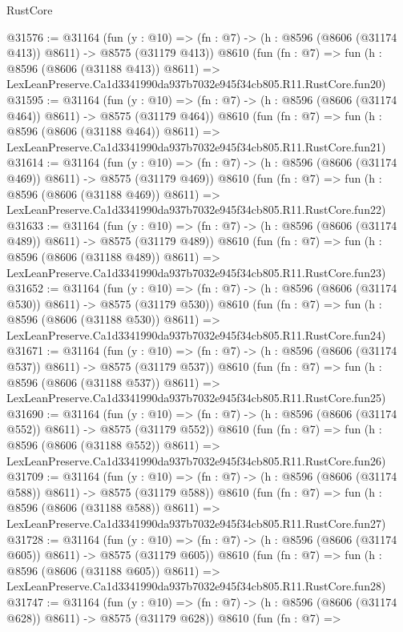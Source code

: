 \begin{lexlean}{RustCore}
\begin{coremodule}
@31576 := @31164
    (fun (y : @10) => (fn : @7) -> (h : @8596 (@8606 (@31174 @413)) @8611) -> @8575 (@31179 @413))
    @8610
    (fun (fn : @7) =>
    fun (h : @8596 (@8606 (@31188 @413)) @8611) =>
    LexLeanPreserve.Ca1d3341990da937b7032e945f34cb805.R11.RustCore.fun20)
@31595 := @31164
    (fun (y : @10) => (fn : @7) -> (h : @8596 (@8606 (@31174 @464)) @8611) -> @8575 (@31179 @464))
    @8610
    (fun (fn : @7) =>
    fun (h : @8596 (@8606 (@31188 @464)) @8611) =>
    LexLeanPreserve.Ca1d3341990da937b7032e945f34cb805.R11.RustCore.fun21)
@31614 := @31164
    (fun (y : @10) => (fn : @7) -> (h : @8596 (@8606 (@31174 @469)) @8611) -> @8575 (@31179 @469))
    @8610
    (fun (fn : @7) =>
    fun (h : @8596 (@8606 (@31188 @469)) @8611) =>
    LexLeanPreserve.Ca1d3341990da937b7032e945f34cb805.R11.RustCore.fun22)
@31633 := @31164
    (fun (y : @10) => (fn : @7) -> (h : @8596 (@8606 (@31174 @489)) @8611) -> @8575 (@31179 @489))
    @8610
    (fun (fn : @7) =>
    fun (h : @8596 (@8606 (@31188 @489)) @8611) =>
    LexLeanPreserve.Ca1d3341990da937b7032e945f34cb805.R11.RustCore.fun23)
@31652 := @31164
    (fun (y : @10) => (fn : @7) -> (h : @8596 (@8606 (@31174 @530)) @8611) -> @8575 (@31179 @530))
    @8610
    (fun (fn : @7) =>
    fun (h : @8596 (@8606 (@31188 @530)) @8611) =>
    LexLeanPreserve.Ca1d3341990da937b7032e945f34cb805.R11.RustCore.fun24)
@31671 := @31164
    (fun (y : @10) => (fn : @7) -> (h : @8596 (@8606 (@31174 @537)) @8611) -> @8575 (@31179 @537))
    @8610
    (fun (fn : @7) =>
    fun (h : @8596 (@8606 (@31188 @537)) @8611) =>
    LexLeanPreserve.Ca1d3341990da937b7032e945f34cb805.R11.RustCore.fun25)
@31690 := @31164
    (fun (y : @10) => (fn : @7) -> (h : @8596 (@8606 (@31174 @552)) @8611) -> @8575 (@31179 @552))
    @8610
    (fun (fn : @7) =>
    fun (h : @8596 (@8606 (@31188 @552)) @8611) =>
    LexLeanPreserve.Ca1d3341990da937b7032e945f34cb805.R11.RustCore.fun26)
@31709 := @31164
    (fun (y : @10) => (fn : @7) -> (h : @8596 (@8606 (@31174 @588)) @8611) -> @8575 (@31179 @588))
    @8610
    (fun (fn : @7) =>
    fun (h : @8596 (@8606 (@31188 @588)) @8611) =>
    LexLeanPreserve.Ca1d3341990da937b7032e945f34cb805.R11.RustCore.fun27)
@31728 := @31164
    (fun (y : @10) => (fn : @7) -> (h : @8596 (@8606 (@31174 @605)) @8611) -> @8575 (@31179 @605))
    @8610
    (fun (fn : @7) =>
    fun (h : @8596 (@8606 (@31188 @605)) @8611) =>
    LexLeanPreserve.Ca1d3341990da937b7032e945f34cb805.R11.RustCore.fun28)
@31747 := @31164
    (fun (y : @10) => (fn : @7) -> (h : @8596 (@8606 (@31174 @628)) @8611) -> @8575 (@31179 @628))
    @8610
    (fun (fn : @7) =>

\end{coremodule}
\end{lexlean}
